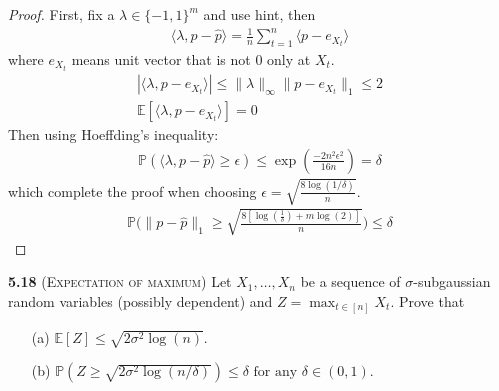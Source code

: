 \begin{proof}
First, fix a $\lambda\in\{-1,1\}^m$ and use hint, then 
\begin{align*}
    \langle \lambda,p-\hat{p}\rangle = \frac{1}{n}\sum_{t=1}^n\langle p-e_{X_t}\rangle
\end{align*}
    where $e_{X_t}$ means unit vector that is not 0 only at $X_t$.
\begin{align*}
    |\langle \lambda,p-e_{X_t}\rangle|\leq\|\lambda\|_\infty\|p-e_{X_t}\|_1\leq 2\\
    \mathbb{E}[\langle\lambda,p-e_{X_t}\rangle] =0
\end{align*}
    Then using Hoeffding's inequality:
\begin{align*}
    \mathbb{P}(\langle\lambda,p-\hat{p}\rangle\ge \epsilon) \leq \exp(\frac{-2n^2\epsilon^2}{16n})=\delta
\end{align*}
which complete the proof when choosing $\epsilon = \sqrt{\frac{8\log(1/\delta)}{n}}$.
\begin{align*}
    \mathbb{P}\bigg(\|p-\hat{p}\|_1\ge \sqrt{\frac{8[\log(\frac{1}{\delta})+m\log(2)]}{n}}\bigg)\leq \delta
\end{align*}




\end{proof}






\noindent \textbf{5.18} (\textsc{Expectation of maximum})
Let $X_{1}, \ldots, X_{n}$ be a sequence of $\sigma$-subgaussian random variables
(possibly dependent) and $Z=\max _{t \in[n]} X_{t}$. Prove that

\begin{itemize}
	\item[(a)] $\mathbb{E}[Z] \leq \sqrt{2 \sigma^{2} \log (n)}$.
	\item[(b)] $\mathbb{P}\left(Z \geq \sqrt{2 \sigma^{2} \log (n / \delta)}\right) \leq \delta \text { for any } \delta \in(0,1)$.
\end{itemize}

